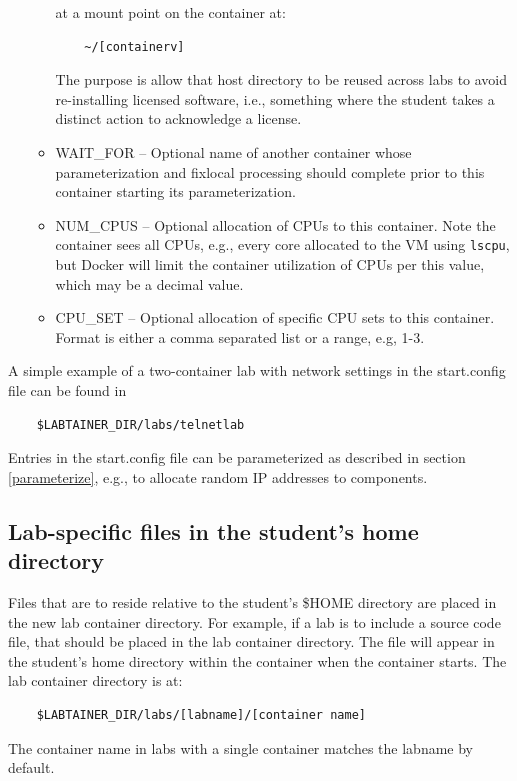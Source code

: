 \documentclass[12pt]{article}
\begin{document}
\begin{itemize}
\begin{itemize}
\noindent at a mount point on the container at:
\begin{verbatim}
    ~/[containerv]
\end{verbatim}
\noindent The purpose is allow that host directory to be reused across labs to avoid re-installing licensed software, i.e.,
something where the student takes a distinct action to acknowledge a license.
\item WAIT\_FOR -- Optional name of another container whose parameterization and fixlocal processing should complete
prior to this container starting its parameterization.
\item NUM\_CPUS -- Optional allocation of CPUs to this container.  Note the container sees all CPUs, e.g., every
core allocated to the VM using {\tt lscpu}, but Docker will limit the container utilization of CPUs per this value,
which may be a decimal value.
\item CPU\_SET -- Optional allocation of specific CPU sets to this container. Format is either a comma separated list
or a range, e.g, 1-3. 
\end{itemize}
\end{itemize}
  
A simple example of a two-container lab with network settings in the start.config file can be found in 
\begin{verbatim}
    $LABTAINER_DIR/labs/telnetlab
\end{verbatim}
Entries in the start.config file can be parameterized as described in section \ref{parameterize}, e.g., to allocate
random IP addresses to components.


\subsection {Lab-specific files in the student's home directory}
\label{home files}
Files that are to reside relative to the student's \$HOME directory are placed in the 
new lab container directory.  For example, if a lab is to include a source code file, that
should be placed in the lab container directory. The file will appear in the student's
home directory within the container when the container starts.  The lab container
directory is at:  

\begin{verbatim}
    $LABTAINER_DIR/labs/[labname]/[container name]
\end{verbatim}
The container name in labs with a single container matches the labname by default.
\end{document}
